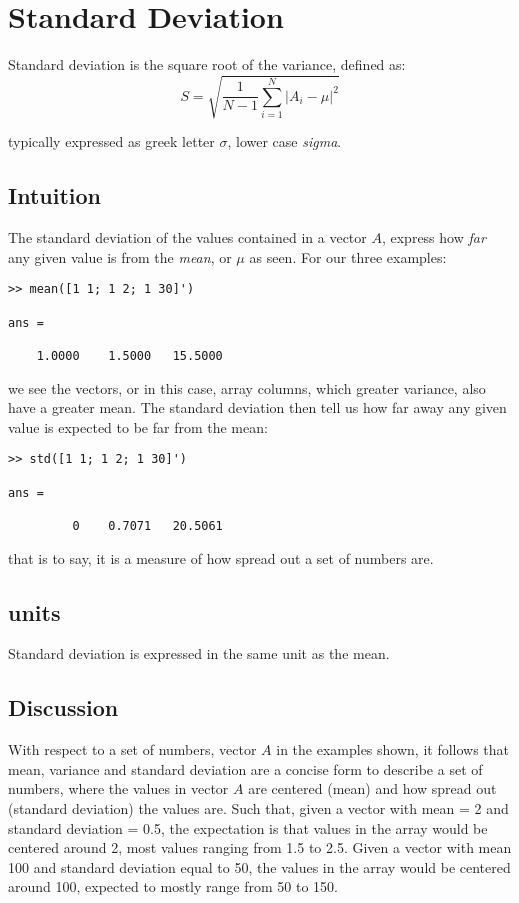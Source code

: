 \section{Standard Deviation}
Standard deviation is the square root of the variance, defined as:
\begin{equation}
S=\sqrt{\frac{1}{N-1}\sum_{i=1}^N|A_i-\mu|^2} \label{standardDeviation}    
\end{equation}


typically expressed as greek letter $\sigma$, lower case \textit{sigma}.

\subsection{Intuition}
The standard deviation of the values contained in a vector $A$, express how \textit{far} any given value is from the \textit{mean}, or $\mu$ as seen.  
For our three examples:
\begin{verbatim}
>> mean([1 1; 1 2; 1 30]')

ans =

    1.0000    1.5000   15.5000
\end{verbatim}
we see the vectors, or in this case, array columns, which greater variance, also have a greater mean. The standard deviation then tell us how far away any given value is expected to be far from the mean:
\begin{verbatim}
>> std([1 1; 1 2; 1 30]')

ans =

         0    0.7071   20.5061
\end{verbatim}
that is to say, it is a measure of how spread out a set of numbers are.

\subsection{units}
Standard deviation is expressed in the same unit as the mean.

\subsection{Discussion}
With respect to a set of numbers, vector $A$ in the examples shown, it follows that mean, variance and standard deviation are a concise form to describe a set of numbers, where the values in vector $A$ are centered (mean) and how spread out (standard deviation) the values are. Such that, given a vector with mean = 2 and standard deviation = 0.5, the expectation is that values in the array would be  centered around 2, most values ranging from 1.5 to 2.5. Given a vector with mean 100 and standard deviation equal to 50, the values in the array would be centered around 100, expected to mostly range from 50 to 150.